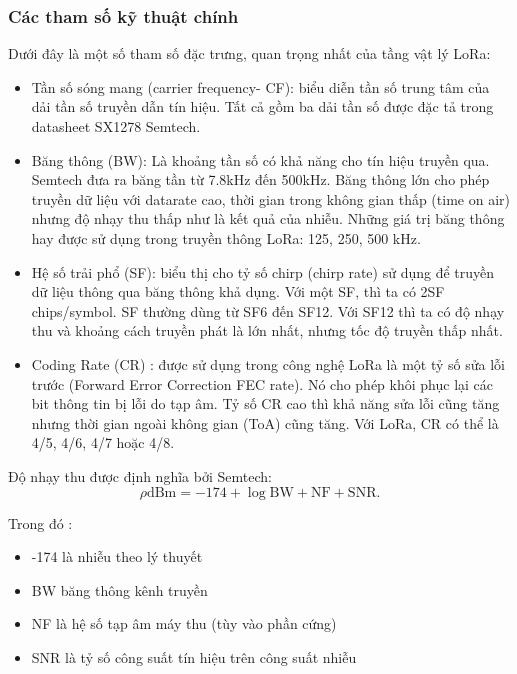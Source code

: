 \documentclass{article} %
\begin{document}
	
	\subsubsection{Các tham số kỹ thuật chính}
	
	Dưới đây là một số tham số đặc trưng, quan trọng nhất của tầng vật lý LoRa\cite{semtech2015an1200}:
	
	\begin{itemize}
		\item Tần số sóng mang (carrier frequency- CF): biểu diễn tần số trung tâm của dải tần số truyền dẫn tín hiệu. Tất cả gồm ba dải tần số được đặc tả trong datasheet SX1278 Semtech.
		\item Băng thông (BW): Là khoảng tần số có khả năng cho tín hiệu truyền qua. Semtech  đưa ra băng tần từ 7.8kHz đến 500kHz. Băng thông lớn cho phép truyền dữ liệu với datarate cao, thời gian trong không gian thấp (time on air) nhưng độ nhạy thu thấp như là kết quả của nhiễu. Những giá trị băng thông hay được sử dụng trong truyền thông LoRa: 125, 250, 500 kHz.
		\item Hệ số trải phổ (SF): biểu thị cho tỷ số chirp (chirp rate) sử dụng để truyền dữ liệu thông qua băng thông khả dụng. Với một SF, thì ta có 2SF chips/symbol. SF thường dùng từ SF6 đến SF12. Với SF12 thì ta có độ nhạy thu và khoảng cách truyền phát là lớn nhất, nhưng tốc độ truyền thấp nhất.
		\item Coding Rate (CR) : được sử dụng trong công nghệ LoRa là một tỷ số sửa lỗi trước (Forward Error Correction FEC rate). Nó cho phép khôi phục lại các bit thông tin bị lỗi do tạp âm. Tỷ số CR cao thì khả năng sửa lỗi cũng tăng nhưng thời gian ngoài không gian (ToA) cũng tăng. Với LoRa, CR có thể là 4/5, 4/6, 4/7 hoặc 4/8.
	\end{itemize}
	
	
	Độ nhạy thu được định nghĩa bởi Semtech\cite{semtech2015an1200}:
	\begin{equation}
		\rho \mathrm{dBm}=-174+\log \mathrm{BW}+\mathrm{NF}+\mathrm{SNR} .
	\end{equation}
	
	Trong đó :
	\begin{itemize}
		\item -174 là nhiễu theo lý thuyết
		\item BW băng thông kênh truyền
		\item NF là hệ số tạp âm máy thu (tùy vào phần cứng)
		\item SNR là tỷ số công suất tín hiệu trên công suất nhiễu
	\end{itemize}
	
\end{document}
